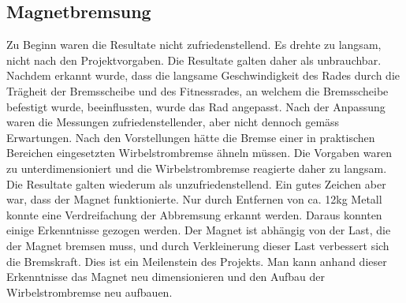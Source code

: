 \subsection{Magnetbremsung}\label{cap:diskussion_magnetbremsung}
Zu Beginn waren die Resultate nicht zufriedenstellend. Es drehte zu langsam, nicht nach den Projektvorgaben. Die Resultate galten daher als unbrauchbar. Nachdem erkannt wurde, dass die langsame Geschwindigkeit des Rades durch die Trägheit der Bremsscheibe und des Fitnessrades, an welchem die Bremsscheibe befestigt wurde, beeinflussten, wurde das Rad angepasst. 
\newpara
Nach der Anpassung waren die Messungen zufriedenstellender, aber nicht dennoch gemäss Erwartungen. Nach den Vorstellungen hätte die Bremse einer in praktischen Bereichen eingesetzten Wirbelstrombremse ähneln müssen. Die Vorgaben waren zu unterdimensioniert und die Wirbelstrombremse reagierte daher zu langsam. Die Resultate galten wiederum als unzufriedenstellend.
\newpara
Ein gutes Zeichen aber war, dass der Magnet funktionierte. Nur durch Entfernen von ca. 12kg Metall konnte eine Verdreifachung der Abbremsung erkannt werden. Daraus konnten einige Erkenntnisse gezogen werden. Der Magnet ist abhängig von der Last, die der Magnet bremsen muss, und durch Verkleinerung dieser Last verbessert sich die Bremskraft. Dies ist ein Meilenstein des Projekts. Man kann anhand dieser Erkenntnisse das Magnet neu dimensionieren und den Aufbau der Wirbelstrombremse neu aufbauen.